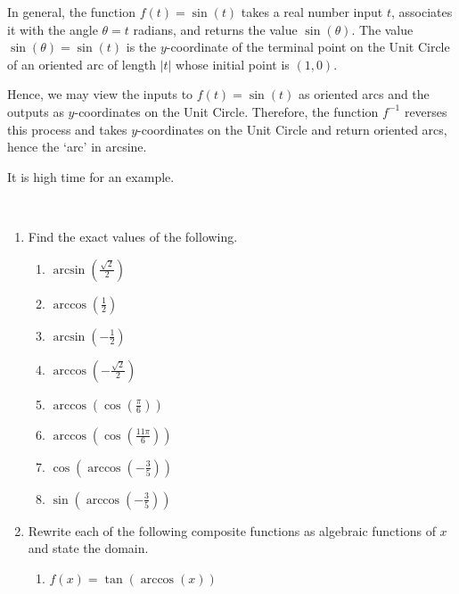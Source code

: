 \documentclass{ximera}
\begin{document}
In general, the function $f(t) = \sin(t)$ takes a real number input $t$, associates it with the angle $\theta = t$ radians, and returns the value $\sin(\theta)$.  The value $\sin(\theta) = \sin(t)$ is the $y$-coordinate of the terminal point on the Unit Circle of an oriented arc of length $|t|$ whose initial point is $(1, 0)$.   

 

Hence, we may view the inputs to $f(t) = \sin(t)$ as oriented arcs and the outputs as $y$-coordinates on the Unit Circle.  Therefore, the function $f^{-1}$ reverses this process and takes $y$-coordinates on the Unit Circle and return oriented arcs, hence the `arc' in arcsine. 

 

It is high time for an example.

\begin{example}  \label{arccosinesineex} $~$

\begin{enumerate}  

\item Find the exact values of the following.

\begin{enumerate}

\item  $\arcsin\left(\frac{\sqrt{2}}{2}\right)$
\item  $\arccos\left(\frac{1}{2}\right)$ 
\item  $\arcsin\left(-\frac{1}{2}\right)$
\item  $\arccos\left(-\frac{\sqrt{2}}{2}\right)$
\item  $\arccos\left( \cos\left(\frac{\pi}{6}\right)\right)$
\item  $\arccos\left( \cos\left(\frac{11\pi}{6}\right)\right)$
\item  $\cos\left(\arccos\left(-\frac{3}{5}\right)\right)$
\item  $\sin\left(\arccos\left(-\frac{3}{5}\right)\right)$
\end{enumerate}

\item  \label{algarcsincos} Rewrite each of the following composite functions as algebraic functions of $x$ and state the domain.

\begin{enumerate}

\item \label{tanarccos} $f(x) = \tan\left(\arccos\left(x \right)\right)$


\end{enumerate}
\end{enumerate}
\end{example}
\end{document}
